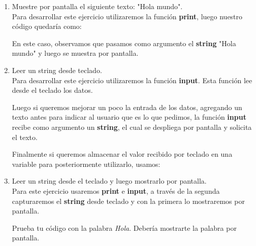 \begin{enumerate}[{Ejercicio} 1.]
        \item Muestre por pantalla el siguiente texto: "Hola mundo".\\

        \asw Para desarrollar este ejercicio utilizaremos la función \textbf{print}, luego nuestro código quedaría como:\\


        En este caso, observamos que pasamos como argumento el \textbf{string} "Hola mundo" y luego se muestra por pantalla.
        
        \item Leer un string desde teclado. \\

        \asw Para desarrollar este ejercicio utilizaremos la función \textbf{input}. Esta función lee desde el teclado los datos. \\
        

        Luego si queremos mejorar un poco la entrada de los datos, agregando un texto antes para indicar al usuario que es lo que pedimos, la función \textbf{input} recibe como argumento un \textbf{string}, el cual se despliega por pantalla y solicita el texto. \\


        Finalmente si queremos almacenar el valor recibido por teclado en una variable para posteriormente utilizarlo, usamos:\\


        \item Leer un string desde el teclado y luego mostrarlo por pantalla.\\
        
        \asw Para este ejercicio usaremos \textbf{print} e \textbf{input}, a través de la segunda capturaremos el \textbf{string} desde teclado y con la primera lo mostraremos por pantalla.\\


        Prueba tu código con la palabra \textit{Hola}. Debería mostrarte la palabra por pantalla.


\end{enumerate}

